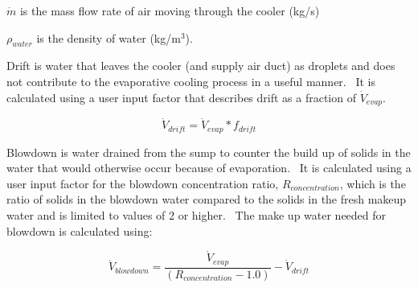 \(\dot m\) is the mass flow rate of air moving through the cooler (kg/s)

\({\rho_{water}}\) is the density of water (kg/m\(^{3}\)).

Drift is water that leaves the cooler (and supply air duct) as droplets and does not contribute to the evaporative cooling process in a useful manner.~ It is calculated using a user input factor that describes drift as a fraction of \({\dot V_{evap}}\).

\begin{equation}
{\dot V_{drift}} = {\dot V_{evap}} * {f_{drift}}
\end{equation}

Blowdown is water drained from the sump to counter the build up of solids in the water that would otherwise occur because of evaporation.~ It is calculated using a user input factor for the blowdown concentration ratio, \({R_{concentration}}\), which is the ratio of solids in the blowdown water compared to the solids in the fresh makeup water and is limited to values of 2 or higher.~ The make up water needed for blowdown is calculated using:

\begin{equation}
{\dot V_{blowdown}} = \frac{{{{\dot V}_{evap}}}}{{\left( {{R_{concentration}} - 1.0} \right)}} - {\dot V_{drift}}
\end{equation}
